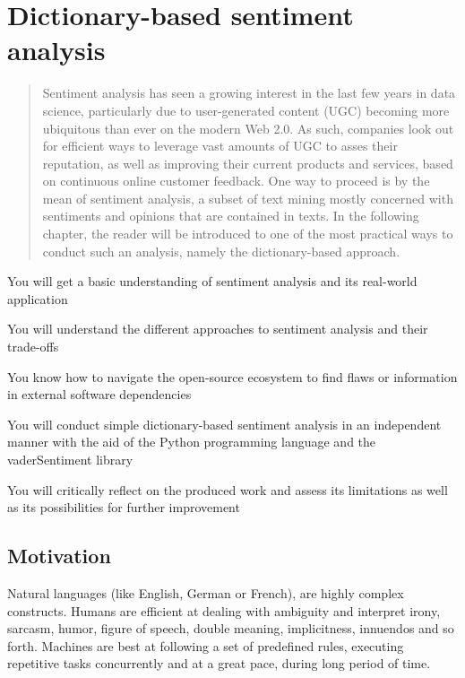 	\chapter{Dictionary-based sentiment analysis}\label{ch:topic1}
	
	\begin{abstract}
		Sentiment analysis has seen a growing interest in the last few years in data science, particularly due to user-generated content (UGC) becoming more ubiquitous than ever on the modern Web 2.0. As such, companies look out for efficient ways to leverage vast amounts of UGC to asses their reputation, as well as improving their current products and services, based on continuous online customer feedback. One way to proceed is by the mean of sentiment analysis, a subset of text mining mostly concerned with sentiments and opinions that are contained in texts. In the following chapter, the reader will be introduced to one of the most practical ways to conduct such an analysis, namely the dictionary-based approach.
	\end{abstract}
	
	\begin{goals}
		\item You will get a basic understanding of sentiment analysis and its real-world application
		\item You will understand the different approaches to sentiment analysis and their trade-offs
		\item You know how to navigate the open-source ecosystem to find flaws or information in external software dependencies
		\item You will conduct simple dictionary-based sentiment analysis in an independent manner with the aid of the Python programming language and the vaderSentiment library
		\item You will critically reflect on the produced work and assess its limitations as well as its possibilities for further improvement
	\end{goals}
	
	\section{Motivation}
	Natural languages (like English, German or French), are highly complex constructs. Humans are efficient at dealing with ambiguity and interpret irony, sarcasm, humor, figure of speech, double meaning, implicitness, innuendos and so forth. Machines are best at following a set of predefined rules, executing repetitive tasks concurrently and at a great pace, during long period of time.
	
